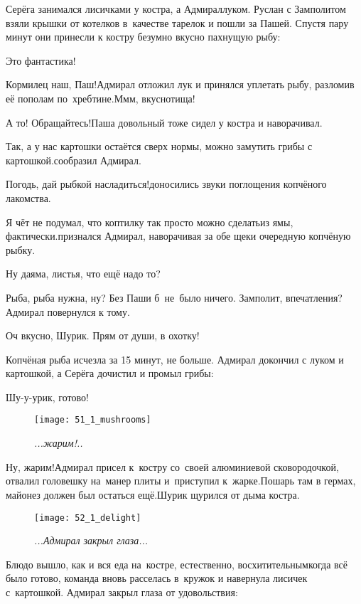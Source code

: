Серёга занимался лисичками у костра, а Адмирал\mdash луком. Руслан с Замполитом взяли крышки от котелков в~качестве тарелок и пошли за Пашей. Спустя пару минут они принесли к костру безумно вкусно пахнущую рыбу:

\diagdash Это фантастика!

\diagdash Кормилец наш, Паш!\mdash Адмирал отложил лук и принялся уплетать рыбу, разломив её пополам по~хребтине.\mdash М\sdash м\sdash м, вкуснотища!

\diagdash А то! Обращайтесь!\mdash Паша довольный тоже сидел у костра и наворачивал.

\diagdash Так, а у нас картошки остаётся сверх нормы, можно замутить грибы с картошкой.\mdash сообразил Адмирал.

\diagdash Погодь, дай рыбкой насладиться!\mdash доносились звуки поглощения копчёного лакомства.

\diagdash Я чёт не подумал, что коптилку так просто можно сделать\mdash из ямы, фактически.\mdash признался Адмирал, наворачивая за обе щеки очередную копчёную рыбку.

\diagdash Ну да\mdash яма, листья, что ещё надо то?

\diagdash Рыба, рыба нужна, ну? Без Паши б~не~было ничего. Замполит, впечатления?\mdash Адмирал повернулся к тому.

\diagdash Оч вкусно, Шурик. Прям от души, в охотку!

Копчёная рыба исчезла за 15 минут, не больше. Адмирал докончил с луком и картошкой, а Серёга дочистил и промыл грибы:

\diagdash Шу-у-урик, готово!

\begin{wrapfigure}[12]{l}{0.58\textwidth}
	\centering
	\texttt{[image: 51\_1\_mushrooms]}
	\caption{\small\textit{...жарим!..}}
\end{wrapfigure}\diagdash Ну, жарим!\mdash Адмирал присел к~костру со~своей алюминиевой сковородочкой, отвалил головешку на~манер плиты и~приступил к~жарке.\mdash Пошарь там в гермах, майонез должен был остаться ещё.\mdash Шурик щурился от дыма костра.

\begin{wrapfigure}[11]{l}{0.58\textwidth}
	\centering
	\texttt{[image: 52\_1\_delight]}
	\caption{\small\textit{...Адмирал закрыл глаза...}}
\end{wrapfigure}
Блюдо вышло, как и вся еда на~костре, естественно, восхитительным\mdash когда всё было готово, команда вновь расселась в~кружок и навернула лисичек с~картошкой. Адмирал закрыл глаза от удовольствия:

